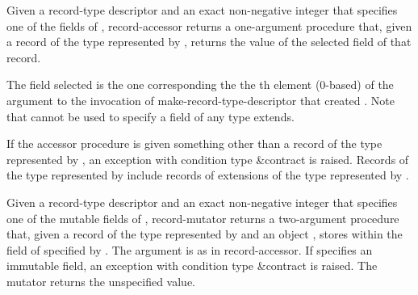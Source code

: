 \begin{entry}{%
}
   
Given a record-type descriptor  and an exact non-negative
integer  that specifies one of the fields of , {\cf
  record-accessor} returns a one-argument procedure that, given a
record of the type represented by , returns the value of the
selected field of that record.

The field selected is the one corresponding the the th element
(0-based) of the  argument to the invocation of {\cf
  make-record-type-descriptor} that created . Note that
 cannot be used to specify a field of any type  extends.

If the accessor procedure is given something other than
a record of the type represented by , an exception with
condition type {\cf\&contract} is raised.  Records
of the type represented by  include records of extensions of
the type represented by .
\end{entry}

\begin{entry}{%
}
   
Given a record-type descriptor  and an exact non-negative
integer  that specifies one of the mutable fields of ,
{\cf record-mutator} returns a two-argument procedure that, given a
record  of the type represented by  and an object
, stores  within the field of  specified by
. The  argument is as in {\cf record-accessor}. If
 specifies an immutable field, an exception with condition type
{\cf\&contract} is raised.
The mutator returns the unspecified value.
\end{entry}

